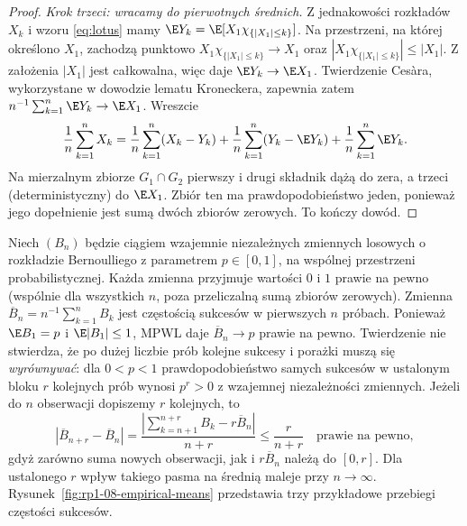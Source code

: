 \begin{proof}
\emph{Krok trzeci: wracamy do pierwotnych średnich.}
Z jednakowości rozkładów $X_k$ i wzoru \eqref{eq:lotus}
mamy $\E Y_k=\E[X_1\chi_{\{|X_1|\leq k\}}]$.
Na przestrzeni, na której określono $X_1$, zachodzą
punktowo $X_1\chi_{\{|X_1|\leq k\}}\to X_1$ oraz
$|X_1\chi_{\{|X_1|\leq k\}}|\leq|X_1|$.
Z założenia $|X_1|$ jest całkowalna, więc
daje $\E Y_k\to\E X_1$.
Twierdzenie Cesàra, wykorzystane w dowodzie lematu
Kroneckera, zapewnia zatem
$n^{-1}\sum_{k=1}^n\E Y_k\to\E X_1$.
Wreszcie
\[
\frac1n\sum_{k=1}^n X_k
=\frac1n\sum_{k=1}^n(X_k-Y_k)
+\frac1n\sum_{k=1}^n(Y_k-\E Y_k)
+\frac1n\sum_{k=1}^n\E Y_k.
\]
Na mierzalnym zbiorze $G_1\cap G_2$ pierwszy i drugi
składnik dążą do zera, a trzeci (deterministyczny)
do $\E X_1$. Zbiór ten ma prawdopodobieństwo jeden,
ponieważ jego dopełnienie jest sumą dwóch zbiorów
zerowych. To kończy dowód.
\end{proof}

\begin{przyklad}
Niech $(B_n)$ będzie ciągiem wzajemnie niezależnych
zmiennych losowych o rozkładzie Bernoulliego
z parametrem $p\in[0,1]$, na wspólnej przestrzeni
probabilistycznej. Każda zmienna przyjmuje wartości
$0$ i $1$ prawie na pewno (wspólnie dla wszystkich $n$,
poza przeliczalną sumą zbiorów zerowych). Zmienna
$\overline B_n=n^{-1}\sum_{k=1}^n B_k$ jest częstością
sukcesów w pierwszych $n$ próbach.
Ponieważ $\E B_1=p$ i $\E|B_1|\leq1$,
MPWL daje $\overline B_n\to p$ prawie na pewno.
Twierdzenie nie stwierdza, że po dużej liczbie prób
kolejne sukcesy i porażki muszą się \emph{wyrównywać}:
dla $0<p<1$ prawdopodobieństwo samych sukcesów
w ustalonym bloku $r$ kolejnych prób wynosi $p^r>0$
z wzajemnej niezależności zmiennych.
Jeżeli do $n$ obserwacji dopiszemy $r$ kolejnych,
to
\[
|\overline B_{n+r}-\overline B_n|
=\frac{\left|\sum_{k=n+1}^{n+r}B_k-r\overline B_n\right|}
{n+r}\leq\frac{r}{n+r}
\quad\text{prawie na pewno},
\]
gdyż zarówno suma nowych obserwacji, jak i
$r\overline B_n$ należą do $[0,r]$.
Dla ustalonego $r$ wpływ takiego pasma na średnią
maleje przy $n\to\infty$.
Rysunek~\ref{fig:rp1-08-empirical-means} przedstawia trzy przykładowe przebiegi częstości sukcesów.
\end{przyklad}

